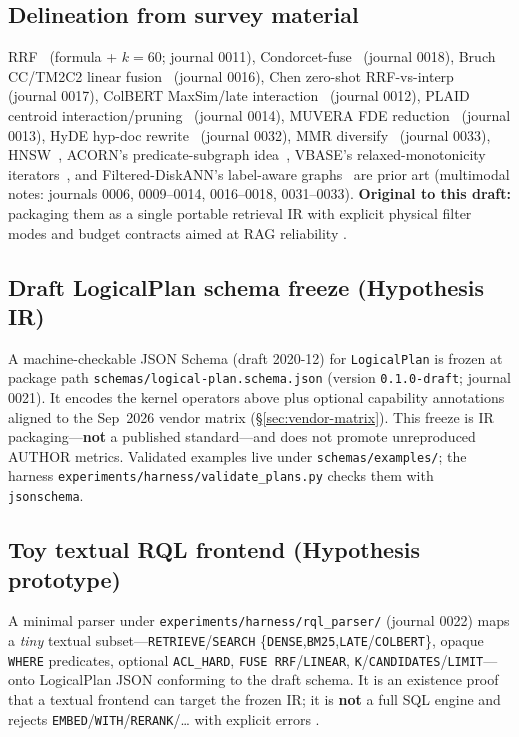\subsection{Delineation from survey material}
RRF~\citep{cormack2009rrf} (formula + \(k{=}60\); journal 0011), Condorcet-fuse~\citep{montague2002condorcet} (journal 0018), Bruch CC/TM2C2 linear fusion~\citep{bruch2023fusion} (journal 0016), Chen zero-shot RRF-vs-interp~\citep{chen2022ood} (journal 0017), ColBERT MaxSim/late interaction~\citep{khattab2020colbert} (journal 0012), PLAID centroid interaction/pruning~\citep{santhanam2022plaid} (journal 0014), MUVERA FDE reduction~\citep{jayaram2024muvera} (journal 0013), HyDE hyp-doc rewrite~\citep{gao2023hyde} (journal 0032), MMR diversify~\citep{carbonell1998mmr} (journal 0033), HNSW~\citep{malkov2018hnsw}, ACORN's predicate-subgraph idea~\citep{patel2024acorn}, VBASE's relaxed-monotonicity iterators~\citep{zhang2023vbase}, and Filtered-DiskANN's label-aware graphs~\citep{gollapudi2023filtered} are prior art (multimodal notes: journals 0006, 0009--0014, 0016--0018, 0031--0033).
\textbf{Original to this draft:} packaging them as a single portable retrieval IR with explicit physical filter modes and budget contracts aimed at RAG reliability \hypothesis{}.

\subsection{Draft LogicalPlan schema freeze (Hypothesis IR)}
\label{sec:logical-schema}
A machine-checkable JSON Schema (draft 2020-12) for \texttt{LogicalPlan} is frozen at package path \texttt{schemas/logical-plan.schema.json} (version \texttt{0.1.0-draft}; journal 0021).
It encodes the kernel operators above plus optional capability annotations aligned to the Sep~2026 vendor matrix (\S\ref{sec:vendor-matrix}).
This freeze is \hypothesis{} IR packaging---\textbf{not} a published standard---and does not promote unreproduced AUTHOR metrics.
Validated examples live under \texttt{schemas/examples/}; the harness \texttt{experiments/harness/validate\_plans.py} checks them with \texttt{jsonschema}.

\subsection{Toy textual RQL frontend (Hypothesis prototype)}
\label{sec:toy-parser}
A minimal parser under \texttt{experiments/harness/rql\_parser/} (journal 0022) maps a \emph{tiny} textual subset---\texttt{RETRIEVE}/\texttt{SEARCH} \{\texttt{DENSE},\texttt{BM25},\texttt{LATE}/\texttt{COLBERT}\}, opaque \texttt{WHERE} predicates, optional \texttt{ACL\_HARD}, \texttt{FUSE RRF}/\texttt{LINEAR}, \texttt{K}/\texttt{CANDIDATES}/\texttt{LIMIT}---onto LogicalPlan JSON conforming to the draft schema.
It is an existence proof that a textual frontend can target the frozen IR; it is \textbf{not} a full SQL engine and rejects \texttt{EMBED}/\texttt{WITH}/\texttt{RERANK}/\ldots{} with explicit errors \hypothesis{}.
